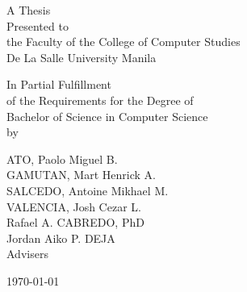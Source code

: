 %
%
%                 

\begin{titlepage}
\centering



\vspace{1.75cm}
A Thesis\\
Presented to\\
the Faculty of the College of Computer Studies\\
De La Salle University Manila

\vspace{1.75cm}
In Partial Fulfillment\\
of the Requirements for the Degree of\\
Bachelor of Science in Computer Science\\
\vspace{1.75cm}
by\\
\vspace{1cm}

ATO, Paolo Miguel B.   \\
GAMUTAN, Mart Henrick A.  \\
SALCEDO, Antoine Mikhael M.   \\
VALENCIA, Josh Cezar L.   \\


\vspace{1.75cm}
Rafael A. CABREDO, PhD \\
Jordan Aiko P. DEJA \\
Advisers

\vspace{1.5cm}
\today
\end{titlepage}
